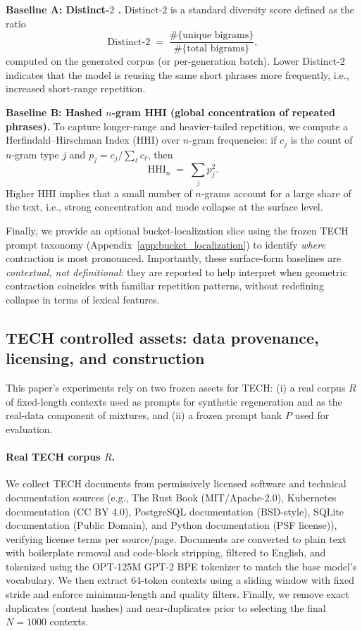 \documentclass{article}
\theoremstyle{plain}
\theoremstyle{definition}
\theoremstyle{remark}
\begin{document}
\textbf{Baseline A: Distinct-$2$ \cite{li-etal-2016-diversity}.}
Distinct-$2$ is a standard diversity score defined as the ratio
\[
\mathrm{Distinct}\text{-}2 \;=\; \frac{\#\{\text{unique bigrams}\}}{\#\{\text{total bigrams}\}},
\]
computed on the generated corpus (or per-generation batch). Lower Distinct-$2$ indicates that the model
is reusing the same short phrases more frequently, i.e., increased short-range repetition.

\textbf{Baseline B: Hashed $n$-gram HHI \cite{CORMODE200558,article111} (global concentration of repeated phrases).}
To capture longer-range and heavier-tailed repetition, we compute a Herfindahl--Hirschman Index (HHI) over
$n$-gram frequencies: if $c_j$ is the count of $n$-gram type $j$ and $p_j=c_j/\sum_\ell c_\ell$, then
\[
\mathrm{HHI}_n \;=\; \sum_j p_j^2 .
\]
Higher HHI implies that a small number of $n$-grams account for a large share of the text, i.e., strong
concentration and mode collapse at the surface level. 

Finally, we provide an optional bucket-localization slice using the frozen TECH prompt taxonomy
(Appendix~\ref{app:bucket_localization}) to identify \emph{where} contraction is most pronounced.
Importantly, these surface-form baselines are \emph{contextual, not definitional}: they are reported to help
interpret when geometric contraction coincides with familiar repetition patterns, without redefining collapse
in terms of lexical features.


\subsection{TECH controlled assets: data provenance, licensing, and construction}
\label{app:tech_data_assets}

This paper’s experiments rely on two frozen assets for TECH: (i) a real corpus $R$ of fixed-length contexts used as prompts for synthetic regeneration and as the  real-data component of mixtures, and (ii) a frozen prompt bank $P$ used for evaluation.

\paragraph{Real TECH corpus $R$.}
We collect TECH documents from permissively licensed software and technical documentation sources (e.g., The Rust Book (MIT/Apache-2.0), Kubernetes documentation (CC BY 4.0), PostgreSQL documentation (BSD-style), SQLite documentation (Public Domain), and Python documentation (PSF license)), verifying license terms per source/page. Documents are converted to plain text with boilerplate removal and code-block stripping, filtered to English, and tokenized using the OPT-125M GPT-2 BPE tokenizer to match the base model’s vocabulary. We then extract 64-token contexts using a sliding window with fixed stride and enforce minimum-length and quality filters. Finally, we remove exact duplicates (content hashes) and near-duplicates prior to selecting the final $N=1000$ contexts.
\end{document}
